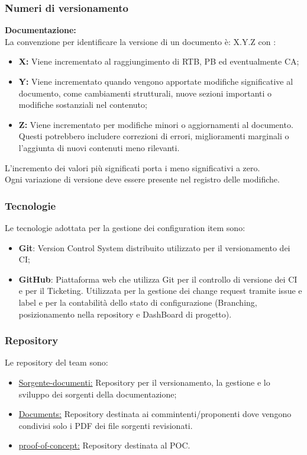 \documentclass{article}
\begin{document}
\subsubsection{Numeri di versionamento}\label{sec:versionamento}
\textbf{Documentazione:} \\
La convenzione per identificare la versione di un documento è: X.Y.Z
con :
\begin{itemize}
    \item \textbf{X: }Viene incrementato al raggiungimento di RTB, PB ed eventualmente CA;
    \item \textbf{Y: }Viene incrementato quando vengono apportate modifiche significative al documento, come cambiamenti strutturali, nuove sezioni importanti o modifiche sostanziali nel contenuto;
    \item \textbf{Z: }Viene incrementato per modifiche minori o aggiornamenti al documento. Questi potrebbero includere correzioni di errori, miglioramenti marginali o l'aggiunta di nuovi contenuti meno rilevanti.
\end{itemize}

L'incremento dei valori più significati  porta i meno significativi a zero. \\
Ogni variazione di versione deve essere presente nel registro delle modifiche.
\subsubsection{Tecnologie}
Le tecnologie adottata per la gestione dei configuration item sono:
\begin{itemize}
    \item \textbf{Git}: Version Control System distribuito utilizzato per il versionamento dei CI;
    \item \textbf{GitHub}: Piattaforma web che utilizza Git per il controllo di versione dei CI e per il Ticketing.
          Utilizzata per la gestione dei change request tramite issue e label e per la contabilità dello stato di configurazione (Branching, posizionamento nella repository e DashBoard di progetto).
\end{itemize}

\subsubsection{Repository}
Le repository del team sono:
\begin{itemize}
    \item \href{https://github.com/ByteOps-swe/Sorgente-documenti}{Sorgente-documenti:} Repository per il versionamento, la gestione e lo sviluppo dei sorgenti della documentazione;
    \item \href{https://github.com/ByteOps-swe/Documents}{Documents:} Repository destinata ai commintenti/proponenti dove vengono condivisi solo i PDF dei file sorgenti revisionati.
    \item \href{https://github.com/ByteOps-swe/proof-of-concept}{proof-of-concept:} Repository destinata al POC.
\end{itemize}
\end{document}
